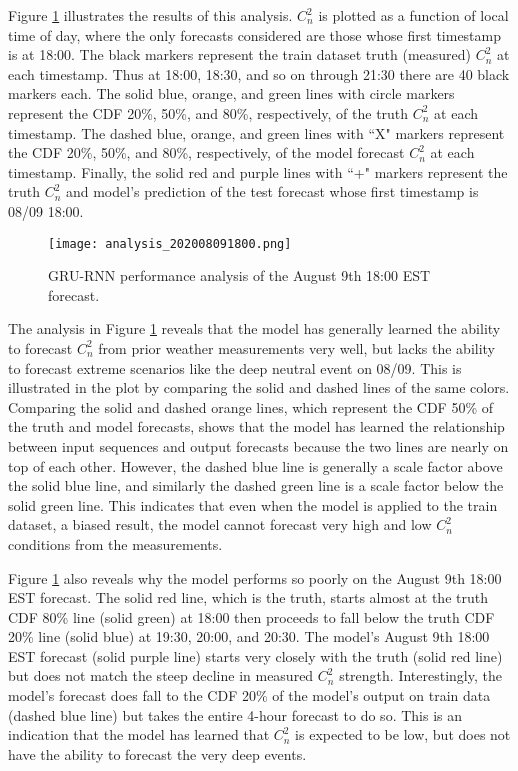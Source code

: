 Figure \ref{fig:analysis_08091800} illustrates the results of this analysis. $C_{n}^{2}$ is plotted as a function of local time of day, where the only forecasts considered are those whose first timestamp is at 18:00. The black markers represent the train dataset truth (measured) $C_{n}^{2}$ at each timestamp. Thus at 18:00, 18:30, and so on through 21:30 there are 40 black markers each. The solid blue, orange, and green lines with circle markers represent the CDF 20\%, 50\%, and 80\%, respectively, of the truth $C_{n}^{2}$ at each timestamp. The dashed blue, orange, and green lines with ``X" markers represent the CDF 20\%, 50\%, and 80\%, respectively, of the model forecast $C_{n}^{2}$ at each timestamp. Finally, the solid red and purple lines with ``+" markers represent the truth $C_{n}^{2}$ and model's prediction of the test forecast whose first timestamp is 08/09 18:00.
\begin{figure}[h!]
	\centering
	\texttt{[image: analysis\_202008091800.png]}
	\caption{GRU-RNN performance analysis of the August 9th 18:00 EST forecast.}
	\label{fig:analysis_08091800}
\end{figure}

The analysis in Figure \ref{fig:analysis_08091800} reveals that the model has generally learned the ability to forecast $C_{n}^{2}$ from prior weather measurements very well, but lacks the ability to forecast extreme scenarios like the deep neutral event on 08/09. This is illustrated in the plot by comparing the solid and dashed lines of the same colors. Comparing the solid and dashed orange lines, which represent the CDF 50\% of the truth and model forecasts, shows that the model has learned the relationship between input sequences and output forecasts because the two lines are nearly on top of each other. However, the dashed blue line is generally a scale factor above the solid blue line, and similarly the dashed green line is a scale factor below the solid green line. This indicates that even when the model is applied to the train dataset, a biased result, the model cannot forecast very high and low $C_{n}^{2}$ conditions from the measurements.

Figure \ref{fig:analysis_08091800} also reveals why the model performs so poorly on the August 9th 18:00 EST forecast. The solid red line, which is the truth, starts almost at the truth CDF 80\% line (solid green) at 18:00 then proceeds to fall below the truth CDF 20\% line (solid blue) at 19:30, 20:00, and 20:30. The model's August 9th 18:00 EST forecast (solid purple line) starts very closely with the truth (solid red line) but does not match the steep decline in measured $C_{n}^{2}$ strength. Interestingly, the model's forecast does fall to the CDF 20\% of the model's output on train data (dashed blue line) but takes the entire 4-hour forecast to do so. This is an indication that the model has learned that $C_{n}^{2}$ is expected to be low, but does not have the ability to forecast the very deep events.

